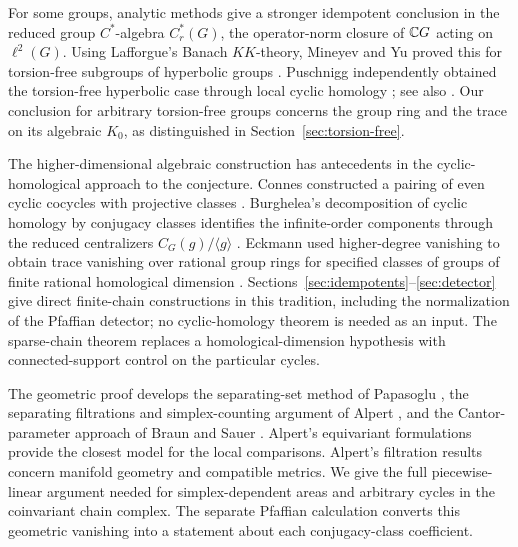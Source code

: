 For some groups, analytic methods give a stronger idempotent conclusion
in the reduced group $C^*$-algebra $C_r^*(G)$, the operator-norm closure
of $\mathbb C G$ acting on $\ell^2(G)$. Using Lafforgue's Banach $KK$-theory,
Mineyev and Yu proved this for torsion-free subgroups of hyperbolic groups
\cite[Theorems 19--21]{MineyevYu2002}. Puschnigg independently obtained
the torsion-free hyperbolic case through local cyclic homology
\cite{Puschnigg2002}; see also \cite[Section 6]{MineyevYu2002}.
Our conclusion for arbitrary torsion-free groups concerns the group ring
and the trace on its algebraic $K_0$, as distinguished in
Section~\ref{sec:torsion-free}.

The higher-dimensional algebraic construction has antecedents in the
cyclic-homological approach to the conjecture. Connes constructed a pairing
of even cyclic cocycles with projective classes
\cite[Part II, \S2, Proposition 14]{Connes1985}. Burghelea's decomposition
of cyclic homology by conjugacy classes identifies the infinite-order
components through the reduced centralizers $C_G(g)/\langle g\rangle$
\cite[Proposition 1.8 and Theorem I]{Burghelea1985}. Eckmann used
higher-degree vanishing to obtain trace vanishing over rational group
rings for specified classes of groups of finite rational homological
dimension \cite[\S3, Theorems 3.1 and 3.3]{Eckmann1986}.
Sections~\ref{sec:idempotents}--\ref{sec:detector} give direct finite-chain
constructions in this tradition, including the normalization of the
Pfaffian detector; no cyclic-homology theorem is needed as an input.
The sparse-chain theorem replaces a homological-dimension hypothesis
with connected-support control on the particular cycles.

The geometric proof develops the separating-set method of Papasoglu
\cite[\S2, especially Lemma 2.5]{Papasoglu2020}, the separating filtrations and simplex-counting
argument of Alpert \cite[Lemmas 4, 6--7]{Alpert2025}, and the
Cantor-parameter approach of Braun and Sauer
\cite[\S\S2, 4--5]{BraunSauer2021}. Alpert's equivariant formulations
\cite[\S4, especially Lemmas 11--12]{Alpert2025} provide the closest model
for the local comparisons. Alpert's filtration results concern manifold
geometry and compatible metrics. We give the full piecewise-linear argument needed
for simplex-dependent areas and arbitrary cycles in the coinvariant
chain complex. The separate Pfaffian calculation converts this
geometric vanishing into a statement about each conjugacy-class
coefficient.
